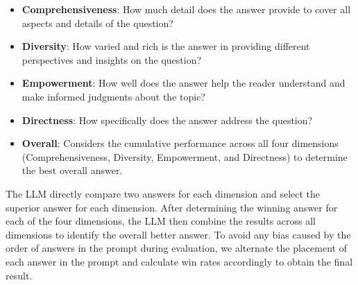 \documentclass{article} %
\begin{document}
\begin{itemize}
    \item \textbf{Comprehensiveness}: How much detail does the answer provide to cover all aspects and details of the question?
    \item \textbf{Diversity}: How varied and rich is the answer in providing different perspectives and insights on the question?
    \item \textbf{Empowerment}: How well does the answer help the reader understand and make informed judgments about the topic?
    \item \textbf{Directness}: How specifically does the answer address the question?
    \item \textbf{Overall}: Considers the cumulative performance across all four dimensions (Comprehensiveness, Diversity, Empowerment, and Directness) to determine the best overall answer.
\end{itemize}

 The LLM directly compare two answers for each dimension and select the superior answer for each dimension. After determining the winning answer for each of the four dimensions, the LLM then combine the results across all dimensions to identify the overall better answer. To avoid any bias caused by the order of answers in the prompt during evaluation, we alternate the placement of each answer in the prompt and calculate win rates accordingly to obtain the final result.
\end{document}
